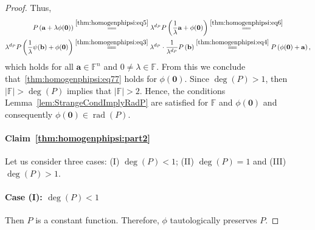 \documentclass[10pt,a4paper]{amsart}
\def\F{{\mathbb F}}
\DeclareMathOperator{\rad}{rad}
\begin{document}
\begin{proof}
Thus,
\begin{multline*}
P\left(\mathbf a + \lambda \phi (\mathbf 0)\right) \overset{\eqref{thm:homogenphipsi:eq5}}{=\joinrel=}  \lambda^{d_P} P\left(\frac{1}{\lambda}\mathbf a + \phi (\mathbf 0)\right)\overset{\eqref{thm:homogenphipsi:eq6}}{=\joinrel=}\\
\lambda^{d_P} P\left(\frac{1}{\lambda}\psi (\mathbf b) + \phi (\mathbf 0)\right) \overset{\eqref{thm:homogenphipsi:eq3}}{=\joinrel=} \lambda^{d_P} \cdot \frac{1}{\lambda^{d_P}}P\left(\mathbf b\right) \overset{\eqref{thm:homogenphipsi:eq4}}{=\joinrel=} P\left(\phi(\mathbf 0) + \mathbf a\right),
\end{multline*}
which holds for all $\mathbf a \in \F^n$ and $0 \neq \lambda \in \F$. From this we conclude that~\eqref{thm:homogenphipsi:eq77} holds for $\phi(\mathbf 0)$. Since $\deg(P) > 1$, then $|\F| > \deg(P)$ implies that $|\F| > 2$. Hence, the conditions Lemma~\ref{lem:StrangeCondImplyRadP} are satisfied for $\F$ and $\phi(\mathbf 0)$  and consequently $\phi(\mathbf 0) \in \rad(P).$

\paragraph{Claim~\ref{thm:homogenphipsi:part2}}%
Let us consider three cases: (I) $\deg(P) < 1$; (II) $\deg(P) = 1$ and (III) $\deg(P) > 1$.

\paragraph{Case (I): $\deg(P) < 1$} Then $P$ is a constant function. Therefore, $\phi$ tautologically preserves $P$. 


\end{proof}
\end{document}
